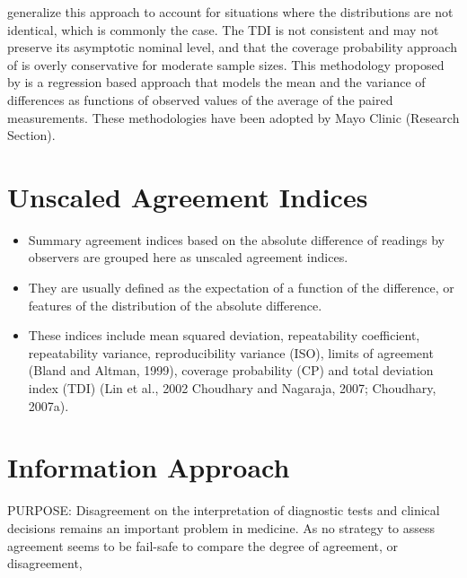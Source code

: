 \documentclass[MAIN.tex]{subfiles}
\begin{document}
	\citet{pkcng} generalize this approach to account for situations where the distributions are not identical, which is commonly the case.
	The TDI is not consistent and may not preserve its asymptotic nominal level, and that the coverage probability approach of \citet{lin2002} is overly conservative for moderate sample sizes.
	This methodology proposed by \citet{pkcng} is a regression based approach that models the mean and the variance of differences as functions of observed values of the average of the paired measurements.
	These methodologies have been adopted by Mayo Clinic (Research Section).
	
	
	
	
	\section{Unscaled Agreement Indices}
	\begin{itemize}
		\item Summary agreement indices based on the absolute difference of readings by observers are
		grouped here as unscaled agreement indices. 
		\item They are usually defined as the expectation
		of a function of the difference, or features of the distribution of the absolute difference.
		
		\item
		These indices include mean squared deviation, repeatability coefficient, repeatability variance,
		reproducibility variance (ISO), limits of agreement (Bland and Altman, 1999), coverage
		probability (CP) and total deviation index (TDI) (Lin et al., 2002 Choudhary and Nagaraja,
		2007; Choudhary, 2007a).
	\end{itemize}
	
	
	\section{Information Approach}
	
	PURPOSE: Disagreement on the interpretation of diagnostic tests and clinical decisions 
	remains an important problem in medicine. As no strategy to assess agreement seems to be 
	fail-safe to compare the degree of agreement, or disagreement, 
	
\end{document}
